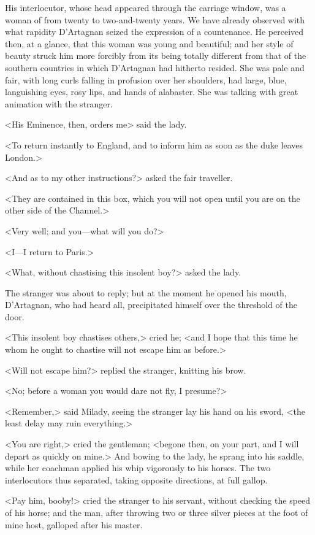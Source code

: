 His interlocutor, whose head appeared through the carriage window, was a woman of from twenty to two-and-twenty years. We have already observed with what rapidity D'Artagnan seized the expression of a countenance. He perceived then, at a glance, that this woman was young and beautiful; and her style of beauty struck him more forcibly from its being totally different from that of the southern countries in which D'Artagnan had hitherto resided. She was pale and fair, with long curls falling in profusion over her shoulders, had large, blue, languishing eyes, rosy lips, and hands of alabaster. She was talking with great animation with the stranger. 

<His Eminence, then, orders me\longdash> said the lady. 

<To return instantly to England, and to inform him as soon as the duke leaves London.> 

<And as to my other instructions?> asked the fair traveller. 

<They are contained in this box, which you will not open until you are on the other side of the Channel.> 

<Very well; and you—what will you do?> 

<I—I return to Paris.> 

<What, without chastising this insolent boy?> asked the lady. 

The stranger was about to reply; but at the moment he opened his mouth, D'Artagnan, who had heard all, precipitated himself over the threshold of the door. 

<This insolent boy chastises others,> cried he; <and I hope that this time he whom he ought to chastise will not escape him as before.> 

<Will not escape him?> replied the stranger, knitting his brow. 

<No; before a woman you would dare not fly, I presume?> 

<Remember,> said Milady, seeing the stranger lay his hand on his sword, <the least delay may ruin everything.> 

<You are right,> cried the gentleman; <begone then, on your part, and I will depart as quickly on mine.> And bowing to the lady, he sprang into his saddle, while her coachman applied his whip vigorously to his horses. The two interlocutors thus separated, taking opposite directions, at full gallop. 

<Pay him, booby!> cried the stranger to his servant, without checking the speed of his horse; and the man, after throwing two or three silver pieces at the foot of mine host, galloped after his master. 

